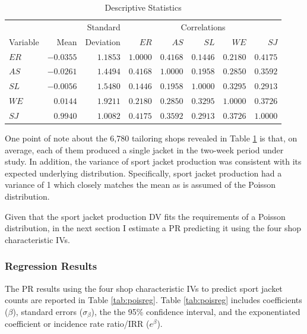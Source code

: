 \documentclass[doc]{apa7}
\begin{document}
	\begin{table}[h!]
		\centering
		\caption{\centering Descriptive Statistics} 
		\begin{tabular}{lrr|rrrrr}
			\hline %
			&  & Standard & \multicolumn{5}{c}{Correlations} \\ 
			Variable & Mean & Deviation & $ER$ & $AS$ & $SL$ & $WE$ & $SJ$ \\ 
			\hline %
			$ER$ & $-0.0355$ & $1.1853$ & $1.0000$ & $0.4168$ & $0.1446$ & $0.2180$ & $0.4175$ \\ 
			$AS$ & $-0.0261$ & $1.4494$ & $0.4168$ & $1.0000$ & $0.1958$ & $0.2850$ & $0.3592$ \\ 
			$SL$ & $-0.0056$ & $1.5480$ & $0.1446$ & $0.1958$ & $1.0000$ & $0.3295$ & $0.2913$ \\ 
			$WE$ & $0.0144$ & $1.9211$ & $0.2180$ & $0.2850$ & $0.3295$ & $1.0000$ & $0.3726$ \\ 
			$SJ$ & $0.9940$ & $1.0082$ & $0.4175$ & $0.3592$ & $0.2913$ & $0.3726$ & $1.0000$ \\ 
			\hline %
		\end{tabular}
		\label{tab:desc}
	\end{table}

	One point of note about the 6,780 tailoring shops revealed in Table \ref{tab:desc} is that, on average, each of them produced a single jacket in the two-week period under study.
	In addition, the variance of sport jacket production was consistent with its expected underlying distribution.
	Specifically, sport jacket production had a variance of 1 which closely matches the mean as is assumed of the Poisson distribution. 
	
	Given that the sport jacket production DV fits the requirements of a Poisson distribution, in the next section I estimate a PR predicting it using the four shop characteristic IVs.

		\subsubsection{Regression Results}
		
	The PR results using the four shop characteristic IVs to predict sport jacket counts are reported in Table \ref{tab:poisreg}. 
	Table \ref{tab:poisreg} includes coefficients ($\beta$), standard errors ($\sigma_{\beta}$), the the 95\% confidence interval, and the exponentiated coefficient or incidence rate ratio/IRR ($e^{\beta}$).
	
\end{document}
